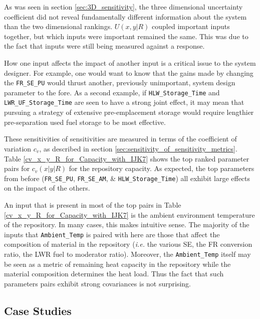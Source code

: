 \documentclass[preprint,12pt]{elsarticle}
\begin{document}
As was seen in section \ref{sec:3D_sensitivity}, the three dimensional uncertainty coefficient did not reveal fundamentally different information
about the system than the two dimensional rankings.  $U(x,y|R)$ coupled important inputs together, but which inputs were important remained the same.  This was
due to the fact that inputs were still being measured against a response.

How one input affects the impact of another input is a critical issue to the system designer.  For example, one would want to know that the gains made by
changing the \texttt{FR\_SE\_PU} would thrust another, previously unimportant, system design parameter to the fore.  As a second example, if \texttt{HLW\_Storage\_Time} and \texttt{LWR\_UF\_Storage\_Time} are seen to have a strong joint effect, it may mean that pursuing a strategy of extensive pre-emplacement storage would require lengthier pre-separation used fuel storage to be most effective.

%


These sensitivities of sensitivities are measured in terms of the coefficient of variation $c_v$, as described in section \ref{sec:sensitivity_of_sensitivity_metrics}.
Table \ref{cv_x_y_R_for_Capacity_with_IJK7} shows the top ranked parameter pairs for $c_v(x|y|R)$ for the repository capacity.
As expected, the top parameters from before (\texttt{FR\_SE\_PU}, \texttt{FR\_SE\_AM}, \& \texttt{HLW\_Storage\_Time}) all exhibit large effects on
the impact of the others.

An input that is present in most of the top pairs in Table \ref{cv_x_y_R_for_Capacity_with_IJK7} is the
ambient environment temperature of the repository.
In many cases, this makes intuitive sense.  The majority of the inputs that \texttt{Ambient\_Temp} is paired with here are those that affect the composition of
material in the repository (\emph{i.e.} the various SE, the FR conversion ratio, the LWR fuel to moderator ratio).
Moreover, the \texttt{Ambient\_Temp} itself may be seen as a metric of remaining heat capacity in the repository while the material composition determines the heat load.
Thus the fact that such parameters pairs exhibit strong covariances is not surprising.



\subsection{Case Studies}
\label{sec:case_studies}
\end{document}
